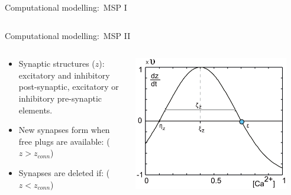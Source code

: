 \begin{frame}[c]{Computational modelling:\ MSP I}
\begin{columns}
\begin{column}{0.5\textwidth}
    \end{column}
  \end{columns}
\end{frame}
\begin{frame}[c]{Computational modelling:\ MSP II}
  \begin{columns}
    \begin{column}{0.6\textwidth}
      \begin{itemize}
        \item Synaptic structures (\(z\)): excitatory \alert{and} inhibitory post-synaptic, excitatory \alert{or} inhibitory pre-synaptic elements.
        \item New synapses form when \alert{free} plugs are available: (\(z > z_{conn}\))
        \item Synapses are deleted if: (\(z < z_{conn}\))
      \end{itemize}
    \end{column}
    \begin{column}{0.5\textwidth}
      \centering
      \includegraphics[width=0.9\textwidth]{99_images/growth-curve-general.png}%
    \end{column}
  \end{columns}
\end{frame}
